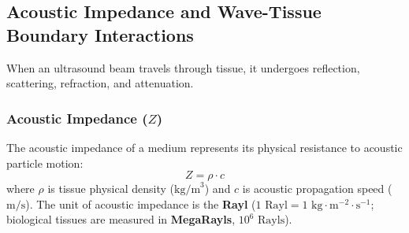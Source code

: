 \documentclass[11pt,a4paper]{article}
\begin{document}
\subsection{Acoustic Impedance and Wave-Tissue Boundary Interactions}
When an ultrasound beam travels through tissue, it undergoes reflection, scattering, refraction, and attenuation.

\subsubsection{Acoustic Impedance ($Z$)}
The acoustic impedance of a medium represents its physical resistance to acoustic particle motion:
\begin{equation}
    Z = \rho \cdot c
\end{equation}
where $\rho$ is tissue physical density ($\text{kg/m}^3$) and $c$ is acoustic propagation speed ($\text{m/s}$). The unit of acoustic impedance is the \textbf{Rayl} ($1\text{ Rayl} = 1\text{ kg}\cdot\text{m}^{-2}\cdot\text{s}^{-1}$; biological tissues are measured in \textbf{MegaRayls}, $10^6\text{ Rayls}$).
\end{document}

